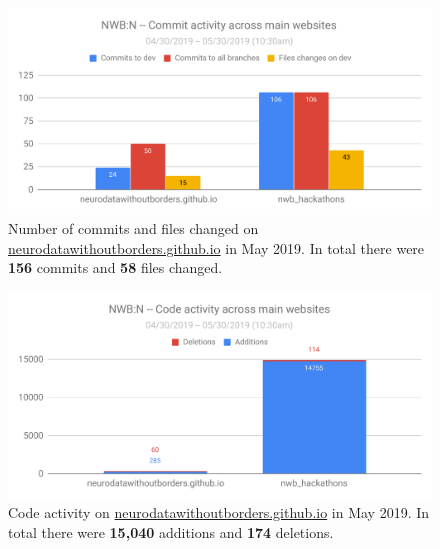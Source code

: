 \documentclass{article}
\begin{document}
\begin{figure}[h!]
  \begin{minipage}[c]{0.67\textwidth}
    \includegraphics[width=\textwidth]{figures/nwbn_activity_websites_commits_files.pdf}
  \end{minipage}\hfill
  \begin{minipage}[c]{0.3\textwidth}
    \caption*{Number of commits and files changed on \href{https://neurodatawithoutborders.github.io/}{neurodatawithoutborders.github.io} in May 2019. In total there were \textbf{156} commits and \textbf{58} files changed.} 
  \end{minipage}
\end{figure}

\begin{figure}[h!]
  \begin{minipage}[c]{0.67\textwidth}
    \includegraphics[width=\textwidth]{figures/nwbn_activity_websites_code.pdf}
  \end{minipage}\hfill
  \begin{minipage}[c]{0.3\textwidth}
    \caption*{Code activity on \href{https://neurodatawithoutborders.github.io/}{neurodatawithoutborders.github.io} in May 2019. In total
there were \textbf{15,040} additions and \textbf{174} deletions.} 
  \end{minipage}
\end{figure}
\end{document}
